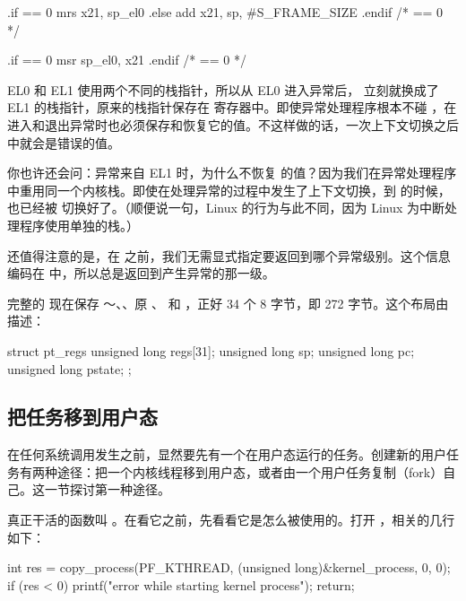 \begin{asmcode}
	.if	\el == 0
	mrs	x21, sp_el0
	.else
	add	x21, sp, #S_FRAME_SIZE
	.endif /* \el == 0 */
\end{asmcode}

\begin{asmcode}
	.if	\el == 0
	msr	sp_el0, x21
	.endif /* \el == 0 */
\end{asmcode}

EL0 和 EL1 使用两个不同的栈指针，所以从 EL0 进入异常后， 立刻就换成了 EL1 的栈指针，原来的栈指针保存在  寄存器中。即使异常处理程序根本不碰 ，在进入和退出异常时也必须保存和恢复它的值。不这样做的话，一次上下文切换之后  中就会是错误的值。

你也许还会问：异常来自 EL1 时，为什么不恢复  的值？因为我们在异常处理程序中重用同一个内核栈。即使在处理异常的过程中发生了上下文切换，到  的时候， 也已经被  切换好了。（顺便说一句，Linux 的行为与此不同，因为 Linux 为中断处理程序使用单独的栈。）

还值得注意的是，在  之前，我们无需显式指定要返回到哪个异常级别。这个信息编码在  中，所以总是返回到产生异常的那一级。

完整的  现在保存 ～、、原 、 和 ，正好 34 个 8 字节，即 272 字节。这个布局由  描述：

\begin{ccode}
struct pt_regs {
	unsigned long regs[31];
	unsigned long sp;
	unsigned long pc;
	unsigned long pstate;
};
\end{ccode}

\subsection{把任务移到用户态}

在任何系统调用发生之前，显然要先有一个在用户态运行的任务。创建新的用户任务有两种途径：把一个内核线程移到用户态，或者由一个用户任务复制（fork）自己。这一节探讨第一种途径。

真正干活的函数叫 。在看它之前，先看看它是怎么被使用的。打开 ，相关的几行如下：

\begin{ccode}
	int res = copy_process(PF_KTHREAD, (unsigned long)&kernel_process, 0, 0);
	if (res < 0) {
		printf("error while starting kernel process");
		return;
	}
\end{ccode}

